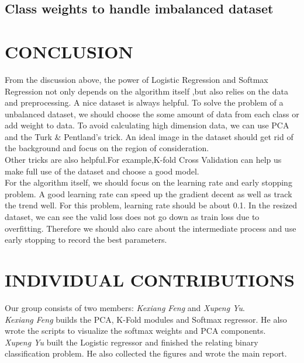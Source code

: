 \documentclass{article} %
\begin{document}
\subsection {Class weights to handle imbalanced dataset}

\section {CONCLUSION}
From the discussion above, the power of Logistic Regression and Softmax Regression not only depends on the algorithm itself ,but also relies on the data and preprocessing.
A nice dataset is always helpful. To solve the problem of a unbalanced dataset, we should choose the some amount of data from each class or add weight to data. To avoid calculating high dimension data, we can use PCA and the Turk \& Pentland's trick. An ideal image in the dataset should get rid of the background and focus on the region of consideration.\\
Other tricks are also helpful.For example,K-fold Cross Validation can help us make full use of the dataset and choose a good model.\\
For the algorithm itself, we should focus on the learning rate and early stopping problem. A good learning rate can speed up the gradient decent as well as track the trend well. For this problem, learning rate should be about 0.1. In the resized dataset, we can see the valid loss does not go down as train loss due to overfitting. Therefore we should also care about the intermediate process and use early stopping to record the best parameters.
\section{INDIVIDUAL CONTRIBUTIONS}
Our group consists of two members: \textit{Kexiang Feng} and \textit{Xupeng Yu}. \\
\textit{Kexiang Feng} builds the PCA, K-Fold modules and Softmax regressor. He also wrote the scripts to visualize the softmax weights and PCA components. \\
\textit{Xupeng Yu} built the Logistic regressor and finished the relating binary classification problem. He also collected the figures and wrote the main report. 




\end{document}

